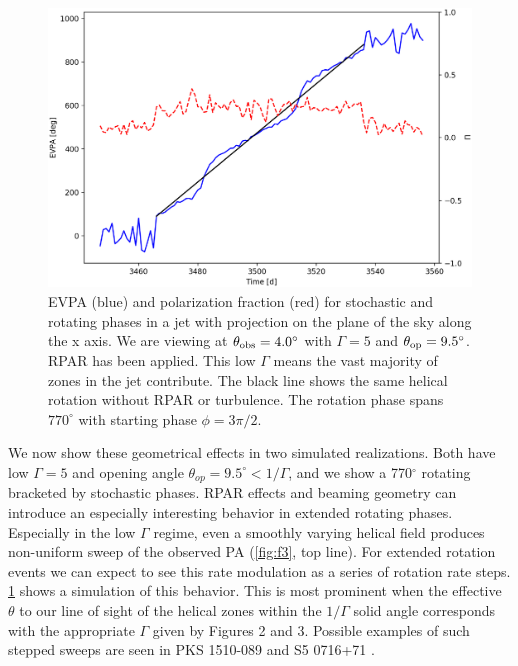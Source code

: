\begin{figure}[t]
\label{fig:f7}
\includegraphics[width=0.8\linewidth]{figures/f7.eps}
\centering
\caption{EVPA (blue) and polarization fraction (red) for stochastic and rotating phases in a jet with projection on the plane of the sky along the x axis. We are viewing at $\theta_{\rm obs}=4.0^{\circ}$ with $\Gamma = 5$ and $\theta_{\rm op} = 9.5^{\circ}$. RPAR has been applied. This low $\Gamma$ means the vast majority of zones in the jet contribute. The black line shows the same helical rotation without RPAR or turbulence. The rotation phase spans $770^{\circ}$ with starting phase $\phi = 3\pi/2$.}
\end{figure}

	We now show these geometrical effects in two simulated realizations. Both have low $\Gamma=5$ and opening angle $\theta_{op}=9.5^{\circ}< 1/\Gamma$, and we show a 770$^{\circ}$ rotating bracketed by stochastic phases. RPAR effects and beaming geometry can introduce an especially interesting behavior in extended rotating phases. Especially in the low $\Gamma$ regime, even a smoothly varying helical field produces non-uniform sweep of the observed PA (\cref{fig:f3}, top line). For extended rotation events we can expect to see this rate modulation as a series of rotation rate steps. \cref{fig:f7} shows a simulation of this behavior. This is most prominent when the effective $\theta$ to our line of sight of the helical zones within the $1/\Gamma$ solid angle corresponds with the appropriate $\Gamma$ given by Figures 2 and 3.  Possible examples of such stepped sweeps are seen in PKS 1510-089 \citep{marscher_probing_2010}
and S5 0716+71 \citep{larionov_outburst_2013}.

